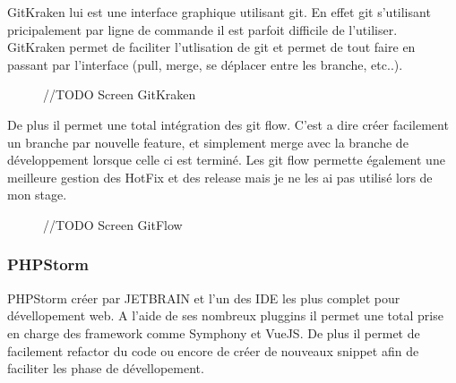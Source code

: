 GitKraken lui est une interface graphique utilisant git. En effet git s'utilisant pricipalement par ligne de commande il est parfoit difficile de l'utiliser. GitKraken permet de faciliter l'utlisation de git et permet de tout faire en passant par l'interface (pull, merge, se déplacer entre les branche, etc..).

\begin{figure}[htbp]
    \center
    //TODO Screen GitKraken
\end{figure}

De plus il permet une total intégration des git flow. C'est a dire créer facilement un branche par nouvelle feature, et simplement merge avec la branche de développement lorsque celle ci est terminé.
Les git flow permette également une meilleure gestion des HotFix et des release mais je ne les ai pas utilisé lors de mon stage. 

\begin{figure}[htbp]
    \center
    //TODO Screen GitFlow
\end{figure}


\subsubsection{PHPStorm}

PHPStorm créer par JETBRAIN et l'un des IDE les plus complet pour dévellopement web.
A l'aide de ses nombreux pluggins il permet une total prise en charge des framework comme Symphony et VueJS. De plus il permet de facilement refactor du code  ou encore de créer de nouveaux snippet afin de faciliter les phase de dévellopement.








